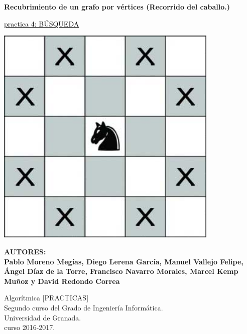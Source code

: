 \documentclass[a4paper, 11pt]{article}
\begin{document}
	
	
	\begin{titlepage}
		\begin{center}
			\vspace*{0.2cm}
			
			{\Huge \textbf{\textcolor{azulillo}{Recubrimiento de un grafo por vértices (Recorrido del caballo.)}}}
			
						{\textcolor{black}	{\Huge\underline{practica 4: BÚSQUEDA}}}
			
				\vspace{0.2cm}
				
				\includegraphics[width=0.8\textwidth]{cover.jpg}
				\vspace{0.2cm}
				

		
			\vspace{1cm}
			
			\textbf{AUTORES: \\
					Pablo Moreno Megías, Diego Lerena García, Manuel Vallejo Felipe, Ángel Díaz de la Torre, Francisco Navarro Morales, Marcel Kemp Muñoz y David Redondo Correa
		    		 }
	    		 \vspace{1cm}
	   
			
			\vfill
			Algorítmica [PRACTICAS]\\
			Segundo curso del Grado de Ingeniería Informática.\\
			Universidad de Granada.\\
			curso 2016-2017.
		\end{center}
	\end{titlepage}
\end{document}
